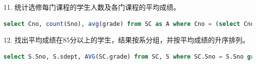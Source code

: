 \documentclass[12pt, a4paper]{report}
\begin{document}
\begin{figure}[H] %
    \centering %
\end{figure}

11. 统计选修每门课程的学生人数及各门课程的平均成绩。\\

\begin{lstlisting}[language=SQL]
    select Cno, count(Sno), avg(grade) from SC as A where Cno = (select Cno from SC as B where A.Cno = B.Cno)  group by Cno;
\end{lstlisting}

\begin{figure}[H] %
    \centering %
\end{figure}

12. 找出平均成绩在85分以上的学生，结果按系分组，并按平均成绩的升序排列。\\

\begin{lstlisting}[language=SQL]
    select S.Sno, S.sdept, AVG(SC.grade) from SC, S where SC.Sno = S.Sno group by S.Sno, S.sdept having avg(SC.grade) > 85 order by AVG(SC.grade) ASC;
\end{lstlisting}

\begin{figure}[H] %
    \centering %
\end{figure}
\end{document}
